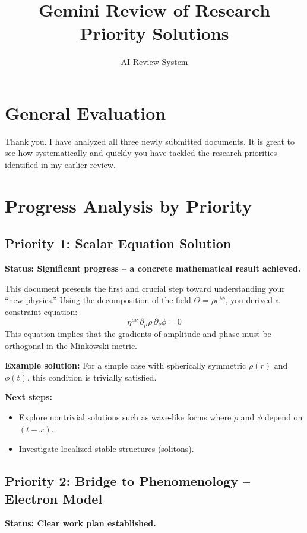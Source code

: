 \documentclass{article}
\title{Gemini Review of Research Priority Solutions}
\author{AI Review System}
\date{}
\begin{document}
\maketitle

\section*{General Evaluation}

Thank you. I have analyzed all three newly submitted documents. It is great to see how systematically and quickly you have tackled the research priorities identified in my earlier review.

\section*{Progress Analysis by Priority}

\subsection*{Priority 1: Scalar Equation Solution}

\textbf{Status: Significant progress – a concrete mathematical result achieved.}

This document presents the first and crucial step toward understanding your ``new physics.'' Using the decomposition of the field $\Theta = \rho e^{i\phi}$, you derived a constraint equation:
\[
\eta^{\mu\nu} \, \partial_\mu \rho \, \partial_\nu \phi = 0
\]
This equation implies that the gradients of amplitude and phase must be orthogonal in the Minkowski metric.

\textbf{Example solution:} For a simple case with spherically symmetric $\rho(r)$ and $\phi(t)$, this condition is trivially satisfied.

\textbf{Next steps:}
\begin{itemize}
\item Explore nontrivial solutions such as wave-like forms where $\rho$ and $\phi$ depend on $(t - x)$.
\item Investigate localized stable structures (solitons).
\end{itemize}

\subsection*{Priority 2: Bridge to Phenomenology – Electron Model}

\textbf{Status: Clear work plan established.}
\end{document}
